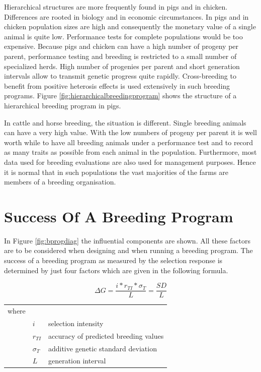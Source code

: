 \documentclass[
]{book}
\begin{document}
Hierarchical structures are more frequently found in pigs and in chicken. Differences are rooted in biology and in economic circumstances. In pigs and in chicken population sizes are high and consequently the monetary value of a single animal is quite low. Performance tests for complete populations would be too expensive. Because pigs and chicken can have a high number of progeny per parent, performance testing and breeding is restricted to a small number of specialized herds. High number of progenies per parent and short generation intervals allow to transmit genetic progress quite rapidly. Cross-breeding to benefit from positive heterosis effects is used extensively in such breeding programs. Figure \ref{fig:hierarchicalbreedingprogram} shows the structure of a hierarchical breeding program in pigs.

In cattle and horse breeding, the situation is different. Single breeding animals can have a very high value. With the low numbers of progeny per parent it is well worth while to have all breeding animals under a performance test and to record as many traits as possible from each animal in the population. Furthermore, most data used for breeding evaluations are also used for management purposes. Hence it is normal that in such populations the vast majorities of the farms are members of a breeding organisation.

\hypertarget{gel-bprog-succbreedprog}{%
\section{Success Of A Breeding Program}\label{gel-bprog-succbreedprog}}

In Figure \ref{fig:bprogdiag} the influential components are shown. All these factors are to be considered when designing and when running a breeding program. The success of a breeding program as measured by the selection response is determined by just four factors which are given in the following formula.

\begin{equation}
\Delta G = \frac{i * r_{TI} * \sigma_T}{L} = \frac{SD}{L}
\label{eq:gel-bprog-selresponse}
\end{equation}

\begin{tabular}{lll}
where  &  &  \\
       &  $i$         &  selection intensity \\
       &  $r_{TI}$    &  accuracy of predicted breeding values \\
       &  $\sigma_T$  &  additive genetic standard deviation \\
       &  $L$         &  generation interval
\end{tabular}
\end{document}
